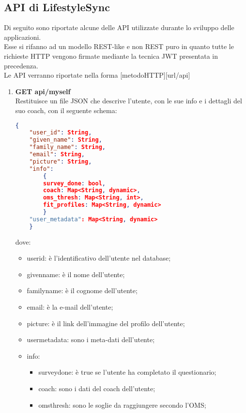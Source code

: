 \subsection{API di LifestyleSync}
Di seguito sono riportate alcune delle API utilizzate durante lo sviluppo delle applicazioni.\\
Esse si rifanno ad un modello REST-like e non REST puro in quanto tutte le richieste HTTP vengono firmate mediante la tecnica \gls{JWT} presentata in precedenza.\\
Le API verranno riportate nella forma [metodo\textunderscore HTTP][url/api]
\begin{enumerate}
    \item \textbf{GET api/myself}\\
    Restituisce un file JSON che descrive l'utente, con le sue info e i dettagli del suo coach, con il seguente schema:
    \begin{lstlisting}[language=json,firstnumber=1,caption={JSON schema dell'API GET api/myself},captionpos=b]
    {
    "user_id": String,
    "given_name": String,
    "family_name": String,
    "email": String,
    "picture": String,
    "info":
        {
        survey_done: bool,
        coach: Map<String, dynamic>,
        oms_thresh: Map<String, int>,
        fit_profiles: Map<String, dynamic>
        }
    "user_metadata": Map<String, dynamic>
    }
    \end{lstlisting}
    dove: \begin{itemize}
        \item user\textunderscore id: è l'identificativo dell'utente nel database;
        \item given\textunderscore name: è il nome dell'utente;
        \item family\textunderscore name: è il cognome dell'utente;
        \item email: è la e-mail dell'utente;
        \item picture: è il link dell'immagine del profilo dell'utente;
        \item user\textunderscore metadata: sono i meta-dati dell'utente;
        \item info:
        \begin{itemize}
            \item survey\textunderscore done: è true se l'utente ha completato il questionario;
            \item coach: sono i dati del coach dell'utente;
            \item oms\textunderscore thresh: sono le soglie da raggiungere secondo l'OMS;

\end{itemize}
\end{itemize}
\end{enumerate}
